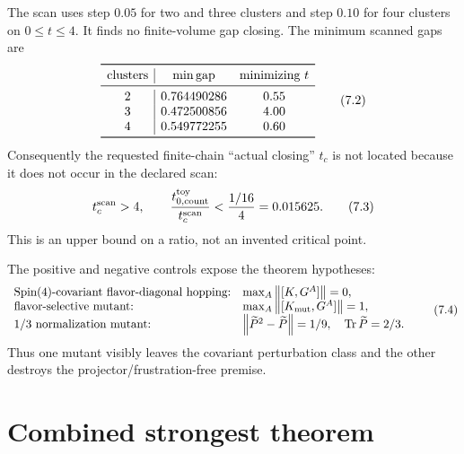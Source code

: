 \documentclass[11pt]{article}
\theoremstyle{remark}
\newcommand{\Tr}{\operatorname{Tr}}
\newcommand{\gap}{\operatorname{gap}}
\newcommand{\norm}[1]{\left\lVert #1\right\rVert}
\begin{document}
The scan uses step $0.05$ for two and three clusters and step $0.10$
for four clusters on $0\leq t\leq4$.  It finds no finite-volume gap
closing.  The minimum scanned gaps are
\[
\begin{array}{c|cc}
\toprule
\text{clusters}&\min\gap&\text{minimizing }t\\
\midrule
2&0.764490286&0.55\\
3&0.472500856&4.00\\
4&0.549772255&0.60\\
\bottomrule
\end{array}
\tag{7.2}\label{eq:scan}
\]
Consequently the requested finite-chain ``actual closing''
$t_c$ is not located because it does not occur in the declared scan:
\[
 t_c^{\rm scan}>4,\qquad
 \frac{t_{0,\mathrm{count}}^{\rm toy}}{t_c^{\rm scan}}
 <\frac{1/16}{4}=0.015625.
\tag{7.3}\label{eq:margin}
\]
This is an upper bound on a ratio, not an invented critical point.

The positive and negative controls expose the theorem hypotheses:
\[
\begin{array}{ll}
\text{Spin(4)-covariant flavor-diagonal hopping:}
 &\max_A\norm{[K,G^A]}=0,\\
\text{flavor-selective mutant:}
 &\max_A\norm{[K_{\rm mut},G^A]}=1,\\
\text{$1/3$ normalization mutant:}
 &\norm{\widetilde P^2-\widetilde P}=1/9,\quad
 \Tr\widetilde P=2/3.
\end{array}
\tag{7.4}\label{eq:mutants}
\]
Thus one mutant visibly leaves the covariant perturbation class and the
other destroys the projector/frustration-free premise.

\section{Combined strongest theorem}
\end{document}
